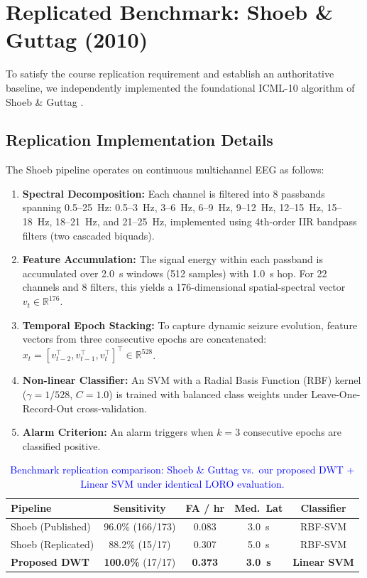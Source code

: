 \documentclass[10pt,twocolumn,letterpaper]{article}
\begin{document}
{\color{blue}
\section{Replicated Benchmark: Shoeb \& Guttag (2010)}
\label{sec:replication}

To satisfy the course replication requirement and establish an authoritative baseline, we independently implemented the foundational ICML-10 algorithm of Shoeb \& Guttag \cite{shoeb2010icml}.

\subsection{Replication Implementation Details}
The Shoeb pipeline operates on continuous multichannel EEG as follows:
\begin{enumerate}
    \item \textbf{Spectral Decomposition:} Each channel is filtered into 8 passbands spanning 0.5--25~Hz: 0.5--3~Hz, 3--6~Hz, 6--9~Hz, 9--12~Hz, 12--15~Hz, 15--18~Hz, 18--21~Hz, and 21--25~Hz, implemented using 4th-order IIR bandpass filters (two cascaded biquads).
    \item \textbf{Feature Accumulation:} The signal energy within each passband is accumulated over 2.0~s windows (512 samples) with 1.0~s hop. For 22 channels and 8 filters, this yields a 176-dimensional spatial-spectral vector $v_t \in \mathbb{R}^{176}$.
    \item \textbf{Temporal Epoch Stacking:} To capture dynamic seizure evolution, feature vectors from three consecutive epochs are concatenated: $x_t = [v_{t-2}^\top, v_{t-1}^\top, v_t^\top]^\top \in \mathbb{R}^{528}$.
    \item \textbf{Non-linear Classifier:} An SVM with a Radial Basis Function (RBF) kernel ($\gamma = 1/528$, $C=1.0$) is trained with balanced class weights under Leave-One-Record-Out cross-validation.
    \item \textbf{Alarm Criterion:} An alarm triggers when $k=3$ consecutive epochs are classified positive.
\end{enumerate}

\begin{table}[h]
\centering
\footnotesize
\setlength{\tabcolsep}{2.5pt}
\color{blue}
\caption{\textcolor{blue}{Benchmark replication comparison: Shoeb \& Guttag vs.\ our proposed DWT + Linear SVM under identical LORO evaluation.}}
\label{tab:replication_comparison}
\begin{tabular}{lcccc}
\toprule
\textbf{Pipeline} & \textbf{Sensitivity} & \textbf{FA / hr} & \textbf{Med.\ Lat} & \textbf{Classifier} \\
\midrule
Shoeb (Published) \cite{shoeb2010icml} & 96.0\% (166/173) & 0.083 & 3.0~s & RBF-SVM \\
Shoeb (Replicated) & 88.2\% (15/17) & 0.307 & 5.0~s & RBF-SVM \\
\textbf{Proposed DWT} & \textbf{100.0\%} (17/17) & \textbf{0.373} & \textbf{3.0~s} & \textbf{Linear SVM} \\
\bottomrule
\end{tabular}
\end{table}

}
\end{document}
